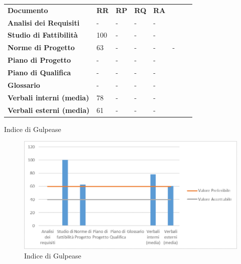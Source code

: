 		\begin{longtable} {						
			>{}p{40mm}  		
			>{}p{8mm}		
			>{}p{8mm}		
			>{}p{8mm}		
			>{}p{8mm}		
			>{}p{8mm}		
			>{}p{8mm}
			>{}p{8mm}				
		}			
		\rowcolor{gray!50}
		\textbf{Documento} & \textbf{RR} & \textbf{RP} & \textbf{RQ} & \textbf{RA} \TBstrut \\ [2mm]
		\textbf{Analisi dei Requisiti} & - & - & - & - \TBstrut \\ [2mm]
		\textbf{Studio di Fattibilità} & 100 & - & - & - \TBstrut \\ [2mm]
		\textbf{Norme di Progetto} & 63 & - & - & - & - \TBstrut \\ [2mm]
		\textbf{Piano di Progetto} & - & - & - & - \TBstrut \\ [2mm]
		\textbf{Piano di Qualifica} & - & - & - & - \TBstrut \\ [2mm]
		\textbf{Glossario} & - & - & - & - \TBstrut \\ [2mm]
		\textbf{Verbali interni (media)} & 78 & - & - & - \TBstrut \\ [2mm]
		\textbf{Verbali esterni (media)}& 61 & - & - & - \TBstrut \\ [2mm]
		\end{longtable}
	\caption{Indice di Gulpease}
		\begin{figure}[H] 	
			\includegraphics[width=\linewidth]{./img/grafici/1.png}	
			\caption{Indice di Gulpease}	
		\end{figure}
